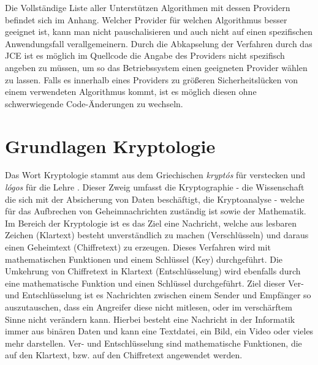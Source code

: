 \documentclass[10pt, a4paper,headsepline]{scrreprt}
\begin{document}
Die Vollständige Liste aller Unterstützen Algorithmen mit dessen Providern befindet sich im Anhang. Welcher Provider für welchen Algorithmus besser geeignet ist, kann man nicht pauschalisieren und auch nicht auf einen spezifischen Anwendungsfall verallgemeinern. Durch die Abkapselung der Verfahren durch das JCE ist es möglich im Quellcode die Angabe des Providers nicht spezifisch angeben zu müssen, um so das Betriebssystem einen geeigneten Provider wählen zu lassen. Falls es innerhalb eines Providers zu größeren Sicherheitslücken von einem verwendeten Algorithmus kommt, ist es möglich diesen ohne schwerwiegende Code-Änderungen zu wechseln. 


\chapter{Grundlagen Kryptologie}
Das Wort Kryptologie stammt aus dem Griechischen \textit{kryptós} für verstecken und \textit{lógos} für die Lehre \cite{website:duden-crypto, website:duden-logie}.
Dieser Zweig umfasst die Kryptographie - die Wissenschaft die sich mit der Absicherung von Daten beschäftigt, die Kryptoanalyse - welche für das Aufbrechen von Geheimnachrichten zuständig ist sowie der Mathematik.
Im Bereich der Kryptologie ist es das Ziel eine Nachricht, welche aus lesbaren Zeichen (Klartext) besteht unverständlich zu machen (Verschlüsseln) und daraus einen Geheimtext (Chiffretext) zu erzeugen. Dieses Verfahren wird mit mathematischen Funktionen und einem Schlüssel (Key) durchgeführt. Die Umkehrung von Chiffretext in Klartext (Entschlüsselung) wird ebenfalls durch eine mathematische Funktion und einen Schlüssel durchgeführt. Ziel dieser Ver- und Entschlüsselung ist es Nachrichten zwischen einem Sender und Empfänger so auszutauschen, dass ein Angreifer diese nicht mitlesen, oder im verschärftem Sinne nicht verändern kann. Hierbei besteht eine Nachricht in der Informatik immer aus binären Daten und kann eine Textdatei, ein Bild, ein Video oder vieles mehr darstellen. Ver- und Entschlüsselung sind mathematische Funktionen, die auf den Klartext, bzw. auf den Chiffretext angewendet werden. 
\end{document}
